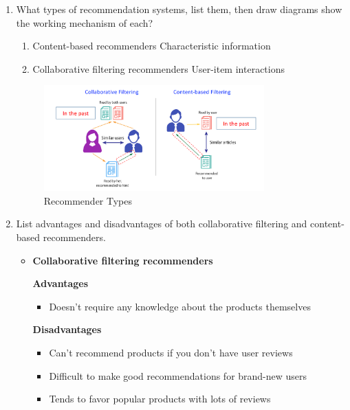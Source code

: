 \documentclass[12pt]{article}
\newenvironment{QandA}{\begin{enumerate}[label=\bfseries\arabic*.]\bfseries}
{\end{enumerate}}
\newenvironment{answered}{\par\normalfont\color{Sepia}}{}
\begin{document}
\begin{QandA}
    \item What types of recommendation systems, list them, then draw
          diagrams show the working mechanism of each?
    \begin{answered}
        \begin{enumerate}
            \item Content-based recommenders \textemdash{} Characteristic information
            \item Collaborative filtering recommenders \textemdash{} User-item interactions
        \end{enumerate}
        \begin{figure}[h!]
            \centering
            \includegraphics[width=0.8\textwidth]{recommenders.png}
            \caption{Recommender Types}
            \label{fig:recommenders}
        \end{figure}

    \end{answered}

    \item List advantages and disadvantages of both collaborative
          filtering and content-based recommenders.
    \begin{answered}
        \begin{itemize}
            \item \textbf{Collaborative filtering recommenders}

            \textbf{Advantages}
                \begin{itemize}
                    \item Doesn't require any knowledge about the products themselves
                \end{itemize}

            \textbf{Disadvantages}
                \begin{itemize}
                    \item Can't recommend products if you don't have user reviews
                    \item Difficult to make good recommendations for brand-new users
                    \item Tends to favor popular products with lots of reviews
                \end{itemize}


\end{itemize}
\end{answered}
\end{QandA}
\end{document}
